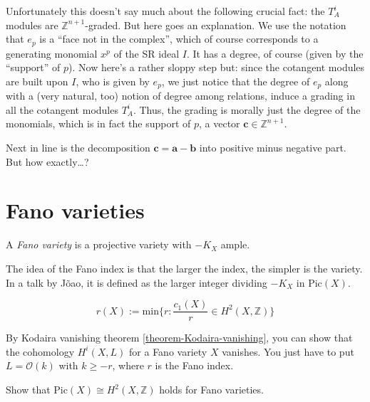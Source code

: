 \documentclass{book}
\begin{document}
\noindent
Unfortunately this doesn't say much about the
following crucial fact:
the $T^i_A$ modules are
$\mathbb{Z}^{n+1}$-graded.
But here goes an explanation.
We use the notation that $e_p$ is a ``face
not in the complex'',
which of course corresponds to a generating
monomial $x^p$
of the SR ideal $I$.
It has a degree, of course (given by the
``support'' of $p$).
Now here's a rather sloppy step but:
since the cotangent modules are built upon
$I$,
who is given by $e_p$,
we just notice that the degree of $e_p$
along with a (very natural, too) notion of
degree among relations,
induce a grading in all the cotangent modules
$T_A^i$.
Thus, the grading is morally just the degree
of the monomials,
which is in fact the support of $p$, a vector
$\mathbf{c} \in \mathbb{Z}^{n+1}$.

Next in line is the decomposition
$\mathbf{c}=\mathbf{a}-\mathbf{b}$
into positive minus negative part. But how
exactly…?








\section{Fano varieties}
\label{section-Fano-varieties}

\begin{definition}
\label{definition-Fano-variety}
A {\it Fano variety} is a projective variety
with $-K_X$ ample.
\end{definition}

\noindent
The idea of the Fano index is that the
larger the index, the simpler is the variety.
In a talk by Jõao, it is defined as the
larger integer
dividing $-K_X$ in $\text{Pic}(X)$.
\begin{definition}
\label{definition-Fano-index}
$$
r(X):=\text{min}\{r:\frac{c_1(X)}{r}\in
H^{2}(X,\mathbb{Z})\}
$$
\end{definition}

\begin{exercise}
\label{exercise-fano-vanis-highe-cohom}
By Kodaira vanishing theorem
\ref{theorem-Kodaira-vanishing},
you can show that the cohomology $H^{i}(X,L)$
for
a Fano variety $X$ vanishes. You just have to
put $L=\mathcal{O}(k)$ with $k\geq
-r$, where $r$ is the Fano index.
\end{exercise}

\begin{exercise}
\label{exercise-Pic-H2-Fano}
Show that  $\text{Pic}(X)\cong
H^{2}(X,\mathbb{Z})$ holds for Fano
varieties.
\end{exercise}
\end{document}
